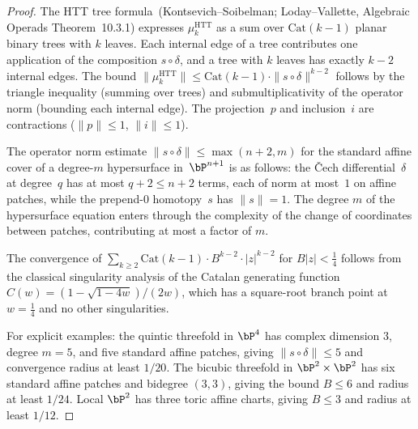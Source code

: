\begin{proof}
The HTT tree formula~\textup{(}Kontsevich--Soibelman; Loday--Vallette, Algebraic Operads Theorem~10.3.1\textup{)} expresses $\mu_k^{\mathrm{HTT}}$ as a sum over $\mathrm{Cat}(k-1)$ planar binary trees with $k$ leaves. Each internal edge of a tree contributes one application of the composition $s \circ \delta$, and a tree with $k$ leaves has exactly $k-2$ internal edges. The bound $\|\mu_k^{\mathrm{HTT}}\| \leq \mathrm{Cat}(k-1) \cdot \|s \circ \delta\|^{k-2}$ follows by the triangle inequality (summing over trees) and submultiplicativity of the operator norm (bounding each internal edge). The projection~$p$ and inclusion~$i$ are contractions ($\|p\| \leq 1$, $\|i\| \leq 1$).

The operator norm estimate \(\|s\circ\delta\|\leq\max(n+2,m)\) for the standard affine cover of a degree-\(m\) hypersurface in~\(\bP^{n+1}\) is as follows: the \v{C}ech differential~\(\delta\) at degree~\(q\) has at most \(q+2\leq n+2\) terms, each of norm at most~\(1\) on affine patches, while the prepend-\(0\) homotopy~\(s\) has \(\|s\|=1\). The degree \(m\) of the hypersurface equation enters through the complexity of the change of coordinates between patches, contributing at most a factor of \(m\).

The convergence of $\sum_{k \geq 2} \mathrm{Cat}(k-1) \cdot B^{k-2} \cdot |z|^{k-2}$ for $B|z| < \frac{1}{4}$ follows from the classical singularity analysis of the Catalan generating function $C(w) = (1 - \sqrt{1-4w})/(2w)$, which has a square-root branch point at $w = \frac{1}{4}$ and no other singularities.

For explicit examples: the quintic threefold in \(\bP^4\) has complex dimension \(3\), degree \(m=5\), and five standard affine patches, giving \(\|s\circ\delta\|\leq5\) and convergence radius at least \(1/20\). The bicubic threefold in \(\bP^2\times\bP^2\) has six standard affine patches and bidegree \((3,3)\), giving the bound \(B\leq6\) and radius at least \(1/24\). Local \(\bP^2\) has three toric affine charts, giving \(B\leq3\) and radius at least \(1/12\).
\end{proof}

